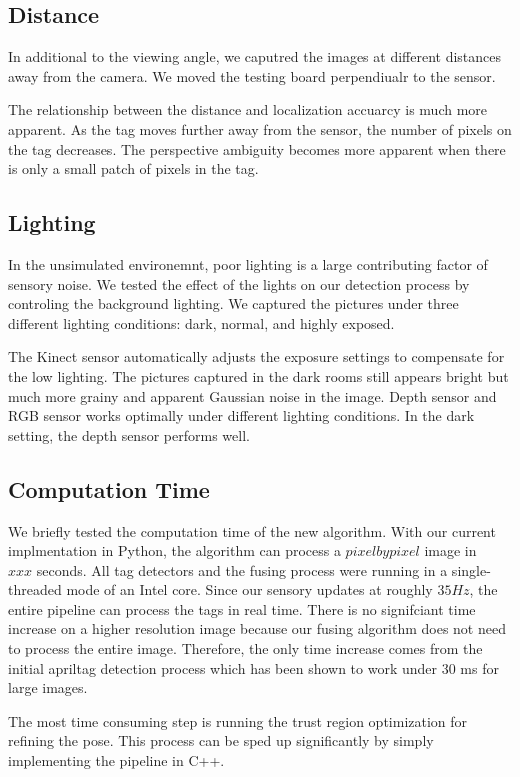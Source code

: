\subsection{Distance}
In additional to the viewing angle, we caputred the images at different distances away from the camera. We moved the testing board perpendiualr to the sensor. 

The relationship between the distance and localization accuarcy is much more apparent. As the tag moves further away from the sensor, the number of pixels on the tag decreases. The perspective ambiguity becomes more apparent when there is only a small patch of pixels in the tag. 
\subsection{Lighting}
In the unsimulated environemnt, poor lighting is a large contributing factor of sensory noise. We tested the effect of the lights on our detection process by controling the background lighting. We captured the pictures under three different lighting conditions: dark, normal, and highly exposed. 

The Kinect sensor automatically adjusts the exposure settings to compensate for the low lighting. The pictures captured in the dark rooms still appears bright but much more grainy and apparent Gaussian noise in the image. Depth sensor and RGB sensor works optimally under different lighting conditions. In the dark setting, the depth sensor performs well. 
\subsection{Computation Time}
We briefly tested the computation time of the new algorithm. With our current implmentation in Python, the algorithm can process a $pixel by pixel$ image in ~$xxx$ seconds. All tag detectors and the fusing process were running in a single-threaded mode of an Intel core. Since our sensory updates at roughly $35Hz$, the entire pipeline can process the tags in real time. There is no signifciant time increase on a higher resolution image because our fusing algorithm does not need to process the entire image. Therefore, the only time increase comes from the initial apriltag detection process which has been shown to work under $30$ ms for large images.

The most time consuming step is running the trust region optimization for refining the pose. This process can be sped up significantly by simply implementing the pipeline in C++.